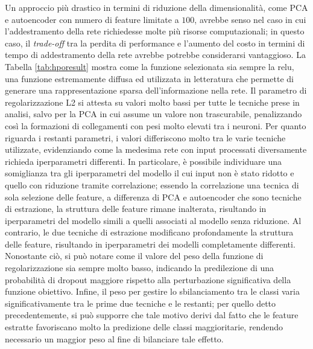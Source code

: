 Un approccio più drastico in termini di riduzione della dimensionalità, come PCA e autoencoder con numero di feature limitate a $100$, avrebbe senso nel caso in cui l'addestramento della rete richiedesse molte più risorse computazionali; in questo caso, il \textit{trade-off} tra la perdita di performance e l'aumento del costo in termini di tempo di addestramento della rete avrebbe potrebbe considerarsi vantaggioso.
La Tabella \ref{tab:hporesult} mostra come la funzione selezionata sia sempre la relu, una funzione estremamente diffusa ed utilizzata in letteratura che permette di generare una rappresentazione sparsa dell'informazione nella rete. 
Il parametro di regolarizzazione L2 si attesta su valori molto bassi per tutte le tecniche prese in analisi, salvo per la PCA in cui assume un valore non trascurabile, penalizzando così la formazioni di collegamenti con pesi molto elevati tra i neuroni. 
Per quanto riguarda i restanti parametri, i valori differiscono molto tra le varie tecniche utilizzate, evidenziando come la medesima rete con input processati diversamente richieda iperparametri differenti. 
In particolare, è possibile individuare una somiglianza tra gli iperparametri del modello il cui input non è stato ridotto e quello con riduzione tramite correlazione; essendo la correlazione una tecnica di sola selezione delle feature, a differenza di PCA e autoencoder che sono tecniche di estrazione, la struttura delle feature rimane inalterata, risultando in iperparametri del modello simili a quelli associati al modello senza riduzione. 
Al contrario, le due tecniche di estrazione modificano profondamente la struttura delle feature, risultando in iperparametri dei modelli completamente differenti.
Nonostante ciò, si può notare come il valore del peso della funzione di regolarizzazione sia sempre molto basso, indicando la predilezione di una probabilità di dropout maggiore rispetto alla perturbazione significativa della funzione obiettivo.
Infine, il peso per gestire lo sbilanciamento tra le classi varia significativamente tra le prime due tecniche e le restanti; per quello detto precedentemente, si può supporre che tale motivo derivi dal fatto che le feature estratte favoriscano molto la predizione delle classi maggioritarie, rendendo necessario un maggior peso al fine di bilanciare tale effetto.


